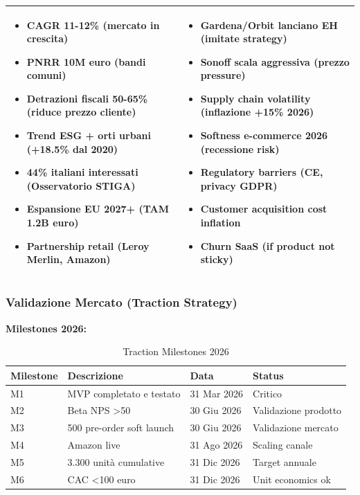 \documentclass[11pt,a4paper]{report}
\begin{document}
\begin{longtable}{|L{5.2cm}|L{5.2cm}|}
\begin{itemize}\itemsep0pt
\item CAGR 11-12\% (mercato in crescita)
\item PNRR 10M euro (bandi comuni)
\item Detrazioni fiscali 50-65\% (riduce prezzo cliente)
\item Trend ESG + orti urbani (+18.5\% dal 2020)
\item 44\% italiani interessati (Osservatorio STIGA)
\item Espansione EU 2027+ (TAM 1.2B euro)
\item Partnership retail (Leroy Merlin, Amazon)
\end{itemize} &
\begin{itemize}\itemsep0pt
\item Gardena/Orbit lanciano EH (imitate strategy)
\item Sonoff scala aggressiva (prezzo pressure)
\item Supply chain volatility (inflazione +15\% 2026)
\item Softness e-commerce 2026 (recessione risk)
\item Regulatory barriers (CE, privacy GDPR)
\item Customer acquisition cost inflation
\item Churn SaaS (if product not sticky)
\end{itemize} \\ \hline
\end{longtable}

\subsubsection{Validazione Mercato (Traction Strategy)}
\textbf{Milestones 2026:}

\begin{table}[H]
\centering
\caption{Traction Milestones 2026}
\label{tab:traction-milestones}
\begin{tabular}{L{2.5cm} L{4.5cm} C{2cm} L{2cm}}
\toprule
{\bf Milestone} & {\bf Descrizione} & {\bf Data} & {\bf Status} \\
\midrule
M1 & MVP completato e testato & 31 Mar 2026 & Critico \\
M2 & Beta NPS >50 & 30 Giu 2026 & Validazione prodotto \\
M3 & 500 pre-order soft launch & 30 Giu 2026 & Validazione mercato \\
M4 & Amazon live & 31 Ago 2026 & Scaling canale \\
M5 & 3.300 unità cumulative & 31 Dic 2026 & Target annuale \\
M6 & CAC <100 euro & 31 Dic 2026 & Unit economics ok \\
\bottomrule
\end{tabular}
\end{table}
\end{document}
